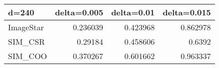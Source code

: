 \begin{tabular}{lrrr}
\hline
 d=240     &   delta=0.005 &   delta=0.01 &   delta=0.015 \\
\hline
 ImageStar &      0.236039 &     0.423968 &      0.862978 \\
 SIM\_CSR   &      0.29184  &     0.458606 &      0.6392   \\
 SIM\_COO   &      0.370267 &     0.601662 &      0.963337 \\
\hline
\end{tabular}
